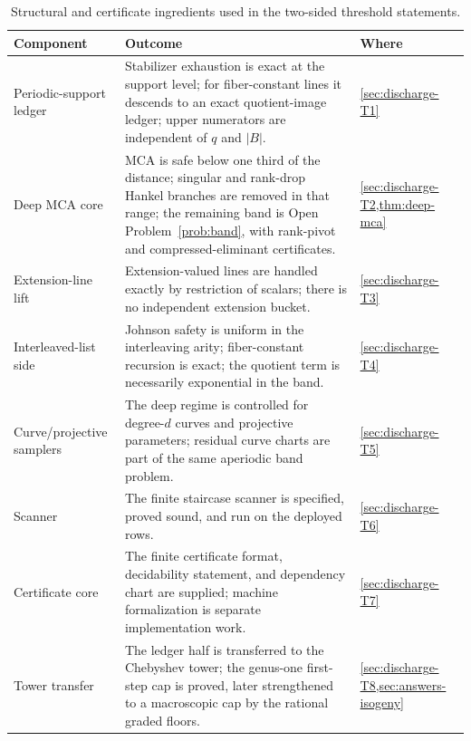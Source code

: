 \documentclass[11pt]{article}
\theoremstyle{definition}
\theoremstyle{remark}
\newcommand{\B}{B}
\begin{document}
\begin{table}[ht]
\centering
\small
\begin{tabular}{@{}p{2.7cm}p{7.9cm}l@{}}
\toprule
Component & Outcome & Where \\
\midrule
Periodic-support ledger & Stabilizer exhaustion is exact at the support level; for fiber-constant lines it descends to an exact quotient-image ledger; upper numerators are independent of $q$ and $|\B|$. & \cref{sec:discharge-T1} \\
Deep MCA core & MCA is safe below one third of the distance; singular and rank-drop Hankel branches are removed in that range; the remaining band is Open Problem~\ref{prob:band}, with rank-pivot and compressed-eliminant certificates. & \cref{sec:discharge-T2,thm:deep-mca} \\
Extension-line lift & Extension-valued lines are handled exactly by restriction of scalars; there is no independent extension bucket. & \cref{sec:discharge-T3} \\
Interleaved-list side & Johnson safety is uniform in the interleaving arity; fiber-constant recursion is exact; the quotient term is necessarily exponential in the band. & \cref{sec:discharge-T4} \\
Curve/projective samplers & The deep regime is controlled for degree-$d$ curves and projective parameters; residual curve charts are part of the same aperiodic band problem. & \cref{sec:discharge-T5} \\
Scanner & The finite staircase scanner is specified, proved sound, and run on the deployed rows. & \cref{sec:discharge-T6} \\
Certificate core & The finite certificate format, decidability statement, and dependency chart are supplied; machine formalization is separate implementation work. & \cref{sec:discharge-T7} \\
Tower transfer & The ledger half is transferred to the Chebyshev tower; the genus-one first-step cap is proved, later strengthened to a macroscopic cap by the rational graded floors. & \cref{sec:discharge-T8,sec:answers-isogeny} \\
\bottomrule
\end{tabular}
\caption{Structural and certificate ingredients used in the two-sided threshold statements.}
\label{tab:status}
\end{table}
\end{document}
